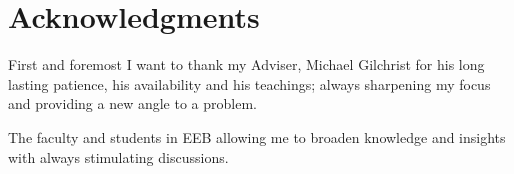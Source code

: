 \chapter*{Acknowledgments}
First and foremost I want to thank my Adviser, Michael Gilchrist for his long lasting patience, his availability and his teachings;
always sharpening my focus and providing a new angle to a problem.

The faculty and students in EEB allowing me to broaden knowledge and insights with always stimulating discussions.